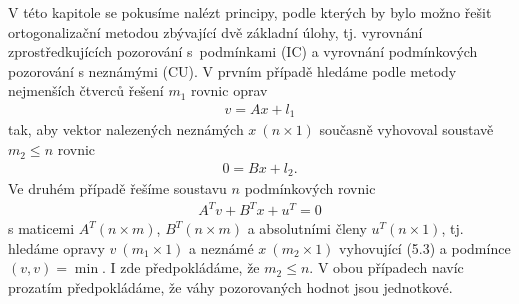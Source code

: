 
V této kapitole  se pokusíme nalézt principy, podle kterých
by bylo možno řešit ortogonalizační metodou zbývající dvě základní
úlohy, tj. vyrovnání zprostředkujících pozorování s~podmínkami (IC) a
vyrovnání podmínkových pozorování s neznámými (CU). V prvním případě
hledáme podle metody nejmenších čtverců řešení $m_1$ rovnic oprav
%
\begin{align*}
  \tag{5.1}
  v = Ax + l_1
\end{align*}
%
tak, aby vektor nalezených neznámých $x ~(n \times 1)$
současně vyhovoval soustavě $m_2 \le n$ rovnic
%
\begin{align*}
  \tag{5.2}
  0 = Bx + l_2.
\end{align*}
%
Ve druhém případě řešíme soustavu $n$ podmínkových rovnic
\begin{align*}
  \tag{5.3}
  A^Tv + B^Tx + u^T = 0
\end{align*}
%
s maticemi $A^T (n \times m)$, $B^T (n \times m)$ a absolutními členy
$u^T (n\times1)$, tj. hledáme opravy $v~(m_1 \times 1)$ a neznámé
$x~(m_2\times1)$ vyhovující (5.3) a podmínce $(v,v) = \min.$
%
I zde předpokládáme, že $m_2\le n.$ V obou případech navíc prozatím
předpokládáme, že váhy pozorovaných hodnot jsou jednotkové.


